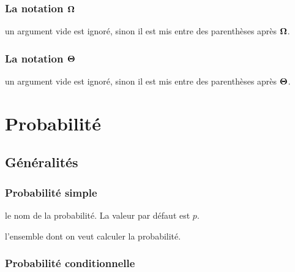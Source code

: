 \documentclass[12pt,a4paper]{book}
\theoremstyle{definition}
\begin{document}
{{%


\subsubsection{\texorpdfstring{La notation $\bigomega{}$}%
                           {La notation "grand Omega"}}




\IDarg{} un argument vide est ignoré, sinon il est mis entre des parenthèses après $\bigomega{}$.




\subsubsection{\texorpdfstring{La notation $\bigtheta{}$}%
                           {La notation "grand Theta"}}




\IDarg{} un argument vide est ignoré, sinon il est mis entre des parenthèses après $\bigtheta{}$.


\section{Probabilité}

\subsection{Généralités}

\subsubsection{Probabilité \og simple \fg}




\IDoption{} le nom de la probabilité. La valeur par défaut est $p$.

\IDarg{} l'ensemble dont on veut calculer la probabilité.




\subsubsection{Probabilité conditionnelle}



}}
\end{document}
